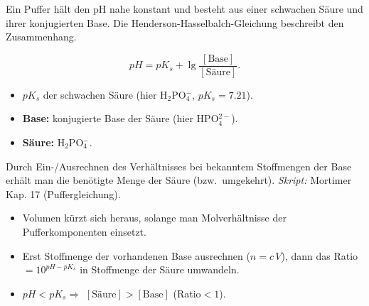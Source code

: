 

Ein Puffer hält den pH nahe konstant und besteht aus einer schwachen Säure
und ihrer konjugierten Base. Die Henderson-Hasselbalch-Gleichung beschreibt
den Zusammenhang.

\begin{werkzeugkasten}
\[
  pH = pK_s + \lg\frac{[\text{Base}]}{[\text{Säure}]}.
\]
\begin{itemize}
  \item $pK_s$ der schwachen Säure (hier H$_2$PO$_4^-$, $pK_s{=}7.21$).
  \item \textbf{Base:} konjugierte Base der Säure (hier HPO$_4^{2-}$).
  \item \textbf{Säure:} H$_2$PO$_4^-$.
\end{itemize}
Durch Ein-/Ausrechnen des Verhältnisses bei bekanntem Stoffmengen der
Base erhält man die benötigte Menge der Säure (bzw.\ umgekehrt).
\textit{Skript:} Mortimer Kap. 17 (Puffergleichung).
\end{werkzeugkasten}

\begin{achtung}
\begin{itemize}
  \item Volumen kürzt sich heraus, solange man Molverhältnisse der
        Pufferkomponenten einsetzt.
  \item Erst Stoffmenge der vorhandenen Base ausrechnen ($n = c\,V$),
        dann das Ratio $=10^{pH-pK_s}$ in Stoffmenge der Säure umwandeln.
  \item $pH<pK_s \Rightarrow$ $[\text{Säure}]>[\text{Base}]$ (Ratio$<1$).
\end{itemize}
\end{achtung}
